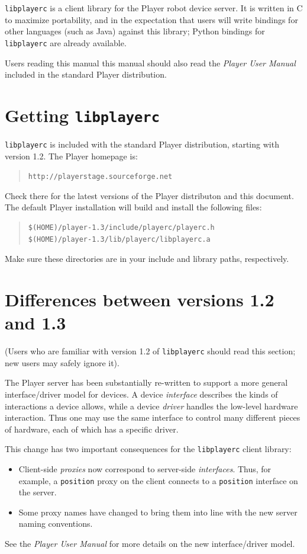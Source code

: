 \documentclass[11pt]{report}
\def\HOMEPAGE {{\tt http://playerstage.sourceforge.net}}
\def\libplayerc {{\tt libplayerc} }
\begin{document}
\libplayerc is a client library for the Player robot device server.
It is written in C to maximize portability, and in the expectation
that users will write bindings for other languages (such as Java)
against this library; Python bindings for \libplayerc are already
available.

Users reading this manual this manual should also read the {\em Player
User Manual} included in the standard Player distribution.


\section{Getting \libplayerc}

\libplayerc is included with the standard Player distribution, starting with
version 1.2.  The Player homepage is:
\begin{quote}
\HOMEPAGE
\end{quote}
Check there for the latest versions of the Player distributon and this
document.  The default Player installation will build and install the
following files:
\begin{quote}
\begin{verbatim}
$(HOME)/player-1.3/include/playerc/playerc.h
$(HOME)/player-1.3/lib/playerc/libplayerc.a
\end{verbatim}
\end{quote}
Make sure these directories are in your include and library paths,
respectively.


\section{Differences between versions 1.2 and 1.3}

(Users who are familiar with version 1.2 of \libplayerc should read
this section; new users may safely ignore it).

The Player server has been substantially re-written to support a more
general interface/driver model for devices.  A device {\em interface}
describes the kinds of interactions a device allows, while a device
{\em driver} handles the low-level hardware interaction.  Thus one may
use the same interface to control many different pieces of hardware,
each of which has a specific driver.

This change has two important consequences for the \libplayerc client
library:
\begin{itemize}
\item Client-side {\em proxies} now correspond to server-side {\em
interfaces}.  Thus, for example, a {\tt position} proxy on the client
connects to a {\tt position} interface on the server.
\item Some proxy names have changed to bring them into line with the
new server naming conventions.
\end{itemize}
See the {\em Player User Manual} for more details on the new
interface/driver model.
\end{document}

